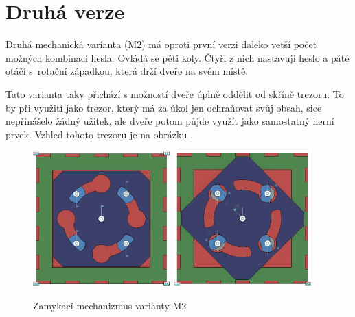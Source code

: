 \newpage
\section{Druhá verze}
\label{M2-vyvoj}

Druhá mechanická varianta (M2) má oproti první verzi daleko vetší počet možných kombinací hesla.
Ovládá se pěti koly. Čtyři z nich nastavují heslo a páté otáčí s~rotační západkou, která drží dveře na svém místě.

Tato varianta taky přichází s možností dveře úplně oddělit od skříně trezoru. To by při využití jako trezor, který
má za úkol jen ochraňovat svůj obsah, sice nepřinášelo žádný užitek, ale dveře potom půjde využít jako samostatný herní prvek. Vzhled tohoto trezoru je na obrázku .

\begin{figure}[htbp]
    \centering
    \includegraphics[width=150pt]{kapitoly/obrazky/M2/mechanizmus_odemcen.png}
    \includegraphics[width=150pt]{kapitoly/obrazky/M2/mechanizmus_zamceno.png}
    \caption{Zamykací mechanizmus varianty M2}
    \label{fig:M2-mechanizmus}
\end{figure}

\newpage